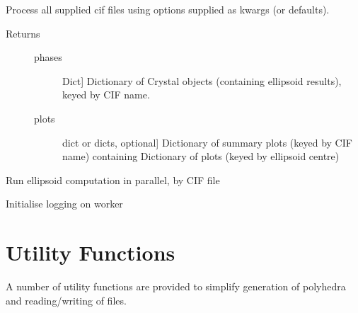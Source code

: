 \documentclass[a4paper,10pt,openany, oneside]{sphinxmanual}
\begin{document}

\begin{fulllineitems}
\label{api_reference:distellipsoid.multiCIF.main}
Process all supplied cif files using options supplied as kwargs (or defaults).
\begin{description}
\item[{Returns}] \leavevmode\begin{description}
\item[{phases}] \leavevmode{[}Dict{]}
Dictionary of Crystal objects (containing ellipsoid results), keyed by CIF name.

\item[{plots}] \leavevmode{[}dict or dicts, optional{]}
Dictionary of summary plots (keyed by CIF name) containing Dictionary
of plots (keyed by ellipsoid centre)

\end{description}

\end{description}

\end{fulllineitems}


\begin{fulllineitems}
\label{api_reference:distellipsoid.multiCIF.run_parallel}
Run ellipsoid computation in parallel, by CIF file

\end{fulllineitems}


\begin{fulllineitems}
\label{api_reference:distellipsoid.multiCIF.worker_configure}
Initialise logging on worker

\end{fulllineitems}



\section{Utility Functions}
\label{api_reference:utility-functions}
A number of utility functions are provided to simplify generation of polyhedra and reading/writing of files.
\end{document}

